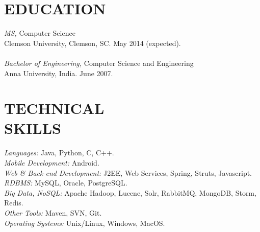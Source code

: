 \documentclass[line,margin]{res}
\begin{document}
\address{813 College Ave, Apt 23, Clemson, SC 29631}
\address{gyanasr@g.clemson.edu $\mid$ (864) 633-9988}

 
\begin{resume}

 
\section{EDUCATION} 
				{\sl MS,} Computer Science \\
                Clemson University, Clemson, SC. 
                May 2014 (expected).\\\\
				{\sl Bachelor of Engineering,} Computer Science and Engineering \\
                Anna University, India.
                June 2007.
 
 
\section{TECHNICAL \\ SKILLS} {\sl Languages:} Java, Python, C, C++.\\
{\sl Mobile Development:} Android. \\
{\sl Web \& Back-end Development:} J2EE, Web Services, Spring, Struts, Javascript. \\
{\sl RDBMS:} MySQL, Oracle, PostgreSQL. \\
{\sl Big Data, NoSQL:} Apache Hadoop, Lucene, Solr, RabbitMQ, MongoDB, Storm, Redis. \\
{\sl Other Tools:} Maven, SVN, Git. \\
{\sl Operating Systems:}  Unix/Linux, Windows, MacOS.
 

\end{resume}
\end{document}
